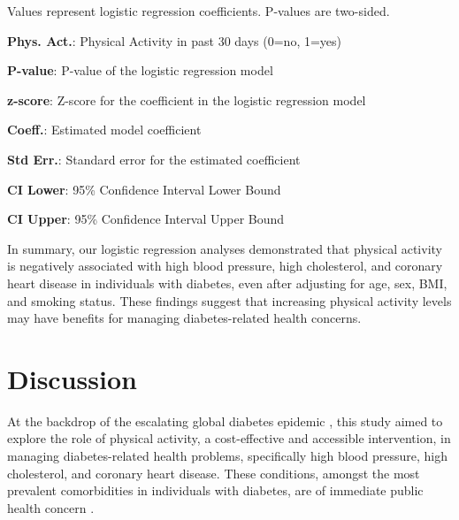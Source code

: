 \documentclass[11pt]{article}
\begin{document}
\begin{table}[h]
\caption{Association between Physical Activity and Heart Dis./Att. in Individuals with Diabetes}
\label{table:physical_activity_heart_disease}
\begin{threeparttable}
\renewcommand{\TPTminimum}{\linewidth}
\begin{tablenotes}
\footnotesize
\item Values represent logistic regression coefficients. P-values are two-sided.
\item \textbf{Phys. Act.}: Physical Activity in past 30 days (0=no, 1=yes)
\item \textbf{P-value}: P-value of the logistic regression model
\item \textbf{z-score}: Z-score for the coefficient in the logistic regression model
\item \textbf{Coeff.}: Estimated model coefficient
\item \textbf{Std Err.}: Standard error for the estimated coefficient
\item \textbf{CI Lower}: 95\% Confidence Interval Lower Bound
\item \textbf{CI Upper}: 95\% Confidence Interval Upper Bound
\end{tablenotes}
\end{threeparttable}
\end{table}


In summary, our logistic regression analyses demonstrated that physical activity is negatively associated with high blood pressure, high cholesterol, and coronary heart disease in individuals with diabetes, even after adjusting for age, sex, BMI, and smoking status. These findings suggest that increasing physical activity levels may have benefits for managing diabetes-related health concerns.

\section*{Discussion}

At the backdrop of the escalating global diabetes epidemic \cite{Moreira2014PrevalenceOM}, this study aimed to explore the role of physical activity, a cost-effective and accessible intervention, in managing diabetes-related health problems, specifically high blood pressure, high cholesterol, and coronary heart disease. These conditions, amongst the most prevalent comorbidities in individuals with diabetes, are of immediate public health concern \cite{Hill2015PhysicalAA, Franssen2020CanCW}. 
\end{document}
